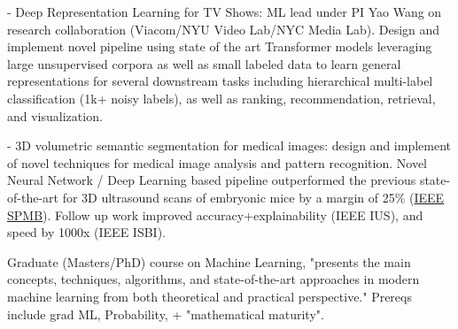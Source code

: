 \documentclass[]{deedy-resume-openfont}
\begin{document}
\begin{minipage}[t]{0.58\textwidth}


- Deep Representation Learning for TV Shows: ML lead under PI Yao Wang on research collaboration (Viacom/NYU Video Lab/NYC Media Lab). Design and implement novel pipeline using state of the art Transformer models leveraging large unsupervised corpora as well as small labeled data to learn general representations for several downstream tasks including hierarchical multi-label classification (1k+ noisy labels), as well as ranking, recommendation, retrieval, and visualization.



- 3D volumetric semantic segmentation for medical images:  design and implement of novel techniques for medical image analysis and pattern recognition. Novel Neural Network / Deep Learning based pipeline outperformed the previous state-of-the-art for 3D ultrasound scans of embryonic mice by a margin of 25\% (\href{https://www.ieeespmb.org/2018/papers/l02_04.pdf}{IEEE SPMB}). Follow up work improved accuracy+explainability (IEEE IUS), and speed by 1000x (IEEE ISBI).


\sectionseplg


Graduate (Masters/PhD) course on Machine Learning, "presents the main concepts, techniques, algorithms, and state-of-the-art approaches in modern machine learning from both theoretical and practical perspective." Prereqs include grad ML, Probability, + "mathematical maturity".


\end{minipage}
\end{document}
